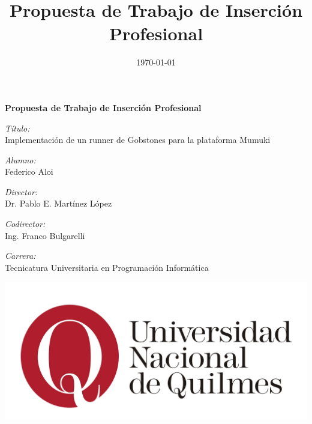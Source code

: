 \documentclass[a4paper,10pt]{article}
\title{Propuesta de Trabajo de Inserción Profesional}
\date{\today}
\begin{document}
\begin{titlepage}

\newcommand{\HRule}{\rule{\linewidth}{0.5mm}} %

\center %
 



{ \huge \bfseries Propuesta de Trabajo de Inserción Profesional}\\[0.4cm] %

\bigskip
\bigskip
\bigskip
\bigskip
\bigskip
\bigskip
 

\Large \emph{Título:}\\
Implementación de un runner de Gobstones para la plataforma Mumuki
\bigskip

\Large \emph{Alumno:}\\
Federico Aloi
\bigskip

\Large \emph{Director:}\\
Dr. Pablo E. Martínez López
\bigskip

\Large \emph{Codirector:}\\
Ing. Franco Bulgarelli
\bigskip

\Large \emph{Carrera:}\\
Tecnicatura Universitaria en Programación Informática

\bigskip
\bigskip
\bigskip

\includegraphics[width=\textwidth,height=\textheight,keepaspectratio]{logo-unq.jpg}\\[1cm]

\end{titlepage}
\end{document}
